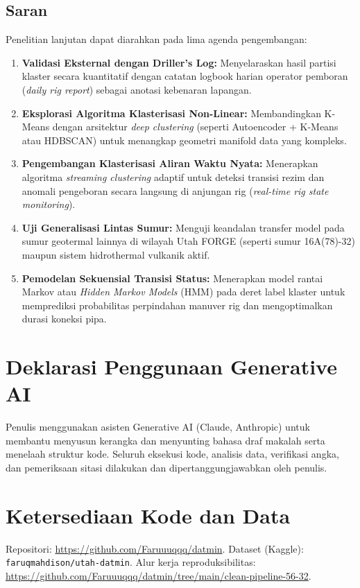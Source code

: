 \documentclass[conference]{IEEEtran}
\begin{document}
\subsection{Saran}
Penelitian lanjutan dapat diarahkan pada lima agenda pengembangan:

\begin{enumerate}
\item \textbf{Validasi Eksternal dengan Driller's Log:} Menyelaraskan hasil partisi klaster secara kuantitatif dengan catatan logbook harian operator pemboran (\textit{daily rig report}) sebagai anotasi kebenaran lapangan.
\item \textbf{Eksplorasi Algoritma Klasterisasi Non-Linear:} Membandingkan K-Means dengan arsitektur \textit{deep clustering} (seperti Autoencoder + K-Means atau HDBSCAN) untuk menangkap geometri manifold data yang kompleks.
\item \textbf{Pengembangan Klasterisasi Aliran Waktu Nyata:} Menerapkan algoritma \textit{streaming clustering} adaptif untuk deteksi transisi rezim dan anomali pengeboran secara langsung di anjungan rig (\textit{real-time rig state monitoring}).
\item \textbf{Uji Generalisasi Lintas Sumur:} Menguji keandalan transfer model pada sumur geotermal lainnya di wilayah Utah FORGE (seperti sumur 16A(78)-32) maupun sistem hidrothermal vulkanik aktif.
\item \textbf{Pemodelan Sekuensial Transisi Status:} Menerapkan model rantai Markov atau \textit{Hidden Markov Models} (HMM) pada deret label klaster untuk memprediksi probabilitas perpindahan manuver rig dan mengoptimalkan durasi koneksi pipa.
\end{enumerate}

\section*{Deklarasi Penggunaan Generative AI}
Penulis menggunakan asisten Generative AI (Claude, Anthropic) untuk membantu menyusun kerangka dan menyunting bahasa draf makalah serta menelaah struktur kode. Seluruh eksekusi kode, analisis data, verifikasi angka, dan pemeriksaan sitasi dilakukan dan dipertanggungjawabkan oleh penulis.

\section*{Ketersediaan Kode dan Data}
Repositori: \url{https://github.com/Faruuuqqq/datmin}. Dataset (Kaggle): \texttt{faruqmahdison/utah-datmin}. Alur kerja reproduksibilitas: \url{https://github.com/Faruuuqqq/datmin/tree/main/clean-pipeline-56-32}.
\end{document}
